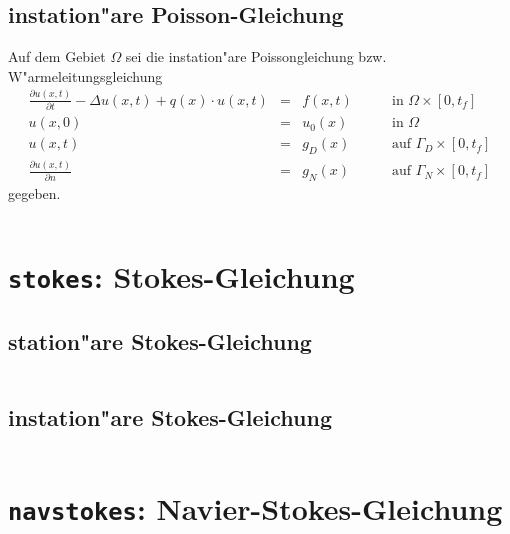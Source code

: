 \documentclass[11pt,a4paper]{article}
\newenvironment{Code}{\begin{quote}\scriptsize}{\end{quote}}
\begin{document}
\subsection{instation"are Poisson-Gleichung}
Auf dem Gebiet $\Omega$ sei die instation"are Poissongleichung bzw.
W"armeleitungsgleichung
\[
\begin{array}{rcll}
    \frac{\partial u(x,t)}{\partial t}-\Delta u(x,t) + q(x)\cdot u(x,t) &=& f(x,t) 
    & \qquad\mbox{in }\Omega\times[0,t_f]\\
    u(x,0) &=& u_0(x) & \qquad\mbox{in }\Omega\\
    u(x,t) &=& g_D(x) & \qquad\mbox{auf }\Gamma_D\times[0,t_f]\\
    \frac{\partial u(x,t)}{\partial n} &=& g_N(x) 
    & \qquad\mbox{auf }\Gamma_N\times[0,t_f]
\end{array}
\]
gegeben.

\begin{Code}
\begin{verbatim}
\end{verbatim}
\end{Code}

\section{{\tt stokes}: Stokes-Gleichung}

\subsection{station"are Stokes-Gleichung}
\begin{Code}
\begin{verbatim}
\end{verbatim}
\end{Code}
\subsection{instation"are Stokes-Gleichung}
\begin{Code}
\begin{verbatim}
\end{verbatim}
\end{Code}
 
\section{{\tt navstokes}: Navier-Stokes-Gleichung}
 
\end{document}
